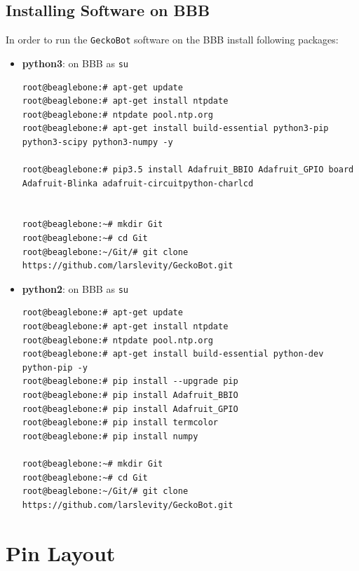 \documentclass[
	fontsize=10pt
	paper=a4
]{scrartcl}
\begin{document}
\subsection{Installing Software on BBB}
In order to run the \texttt{GeckoBot} software on the BBB install following packages:
\begin{itemize}


\item \textbf{python3}: on BBB as \texttt{su}
\begin{lstlisting}
root@beaglebone:# apt-get update
root@beaglebone:# apt-get install ntpdate
root@beaglebone:# ntpdate pool.ntp.org
root@beaglebone:# apt-get install build-essential python3-pip python3-scipy python3-numpy -y

root@beaglebone:# pip3.5 install Adafruit_BBIO Adafruit_GPIO board Adafruit-Blinka adafruit-circuitpython-charlcd


root@beaglebone:~# mkdir Git
root@beaglebone:~# cd Git
root@beaglebone:~/Git/# git clone https://github.com/larslevity/GeckoBot.git

\end{lstlisting}



\item \begin{footnotesize}
\textbf{python2}:
on BBB as \texttt{su}
\begin{lstlisting}
root@beaglebone:# apt-get update
root@beaglebone:# apt-get install ntpdate
root@beaglebone:# ntpdate pool.ntp.org
root@beaglebone:# apt-get install build-essential python-dev python-pip -y
root@beaglebone:# pip install --upgrade pip
root@beaglebone:# pip install Adafruit_BBIO
root@beaglebone:# pip install Adafruit_GPIO
root@beaglebone:# pip install termcolor
root@beaglebone:# pip install numpy

root@beaglebone:~# mkdir Git
root@beaglebone:~# cd Git
root@beaglebone:~/Git/# git clone https://github.com/larslevity/GeckoBot.git

\end{lstlisting}
\end{footnotesize}


\end{itemize}








\clearpage

\section{Pin Layout}
\end{document}
